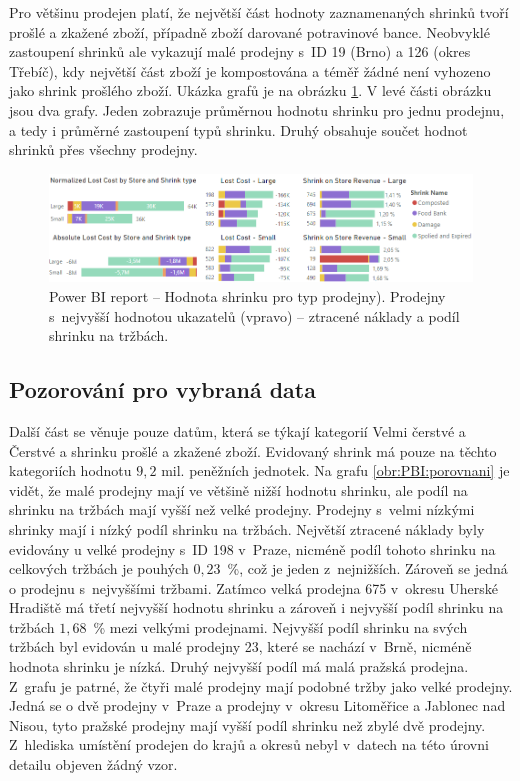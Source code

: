 Pro většinu prodejen platí, že největší část hodnoty zaznamenaných shrinků tvoří prošlé a zkažené zboží, případně zboží darované potravinové bance. Neobvyklé zastoupení shrinků ale vykazují malé prodejny s~ID 19 (Brno) a 126 (okres Třebíč), kdy největší část zboží je kompostována a téměř žádné není vyhozeno jako shrink prošlého zboží. Ukázka grafů je na obrázku \ref*{obr:PBI:topwhs}. V levé části obrázku jsou dva grafy. Jeden zobrazuje průměrnou hodnotu shrinku pro jednu prodejnu, a tedy i průměrné zastoupení typů shrinku. Druhý obsahuje součet hodnot shrinků přes všechny prodejny.

\begin{figure}[h!]
    \centering
    \captionsetup{justification=centering}
    \includegraphics[width=\textwidth]{obrazky/PBI/topwhs.png}
    \caption{Power BI report -- Hodnota shrinku pro typ prodejny). Prodejny s~nejvyšší hodnotou ukazatelů (vpravo) -- ztracené náklady a podíl shrinku na tržbách.}
    \label{obr:PBI:topwhs}
\end{figure}

\subsection*{Pozorování pro vybraná data}

Další část se věnuje pouze datům, která se týkají kategorií Velmi čerstvé a Čerstvé a shrinku prošlé a zkažené zboží. Evidovaný shrink má pouze na těchto kategoriích hodnotu $9{,}2$ mil. peněžních jednotek. 
Na grafu \ref*{obr:PBI:porovnani} je vidět, že malé prodejny mají ve většině nižší hodnotu shrinku, ale podíl na shrinku na tržbách mají vyšší než velké prodejny. Prodejny s~velmi nízkými shrinky mají i nízký podíl shrinku na tržbách. 
Největší ztracené náklady byly evidovány u velké prodejny s~ID 198 v~Praze, nicméně podíl tohoto shrinku na celkových tržbách je pouhých $0{,}23$~\%, což je jeden z~nejnižších. Zároveň se jedná o prodejnu s~nejvyššími tržbami. Zatímco velká prodejna 675 v~okresu Uherské Hradiště má třetí nejvyšší hodnotu shrinku a zároveň i nejvyšší podíl shrinku na tržbách $1{,}68$~\% mezi velkými prodejnami. 
Nejvyšší podíl shrinku na svých tržbách byl evidován u malé prodejny 23, které se nachází v~Brně, nicméně hodnota shrinku je nízká. Druhý nejvyšší podíl má malá pražská prodejna.
Z~grafu je patrné, že čtyři malé prodejny mají podobné tržby jako velké prodejny. Jedná se o dvě prodejny v~Praze a prodejny v~okresu Litoměřice a Jablonec nad Nisou, tyto pražské prodejny mají vyšší podíl shrinku než zbylé dvě prodejny.
Z~hlediska umístění prodejen do krajů a okresů nebyl v~datech na této úrovni detailu objeven žádný vzor.

